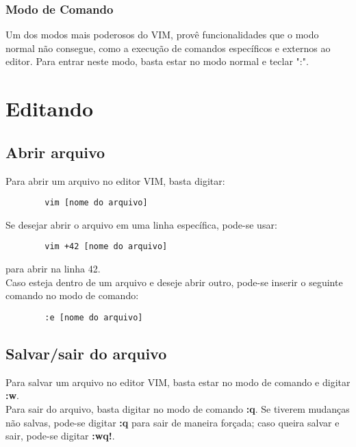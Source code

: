 \documentclass[12pt]{article}
\begin{document}
		\subsubsection{Modo de Comando}
		Um dos modos mais poderosos do VIM, provê funcionalidades que o modo normal não consegue, como a execução de comandos específicos e externos ao editor. Para entrar neste modo, basta estar no modo normal e teclar ":". 
	\newpage

\section{Editando}
	\subsection{Abrir arquivo}
	Para abrir um arquivo no editor VIM, basta digitar:
	\begin{lstlisting}
		vim [nome do arquivo]
	\end{lstlisting}
	Se desejar abrir o arquivo em uma linha específica, pode-se usar:
	\begin{lstlisting}
		vim +42 [nome do arquivo]
	\end{lstlisting}
	para abrir na linha 42. \\
	Caso esteja dentro de um arquivo e deseje abrir outro, pode-se inserir o seguinte comando no modo de comando:
	\begin{lstlisting}
		:e [nome do arquivo]
	\end{lstlisting} 
	\subsection{Salvar/sair do arquivo}
	Para salvar um arquivo no editor VIM, basta estar no modo de comando e digitar \textbf{:w}. \\
	Para sair do arquivo, basta digitar no modo de comando \textbf{:q}. Se tiverem mudanças não salvas, pode-se digitar \textbf{:q} para sair de maneira forçada; caso queira salvar e sair, pode-se digitar \textbf{:wq!}. 
\end{document}
